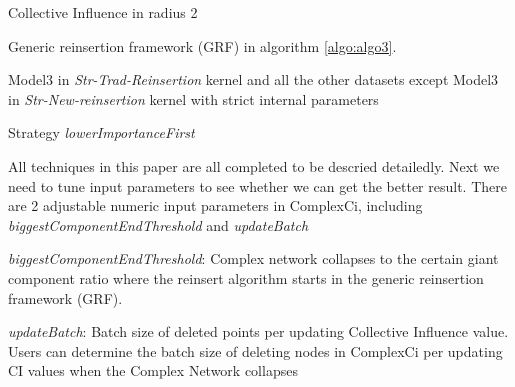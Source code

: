 \documentclass{article}
\begin{document}
	\begin{enumerate}
	
		\begin{item}	
			Collective Influence in radius 2
		\end{item}
	
		\begin{item}	
			Generic reinsertion framework (GRF) in algorithm \ref{algo:algo3}. 
		\end{item}	
		
		\begin{item}
			Model3 in \textit{Str-Trad-Reinsertion} kernel and all the other datasets except Model3 in \textit{Str-New-reinsertion} kernel with strict internal parameters
		\end{item}
	
		\begin{item}
			Strategy \textit{lowerImportanceFirst}
		\end{item}	
	
	\end{enumerate}	
	 
	 
	 
	 All techniques in this paper are all completed to be descried detailedly. Next we need to tune input parameters to see whether we can get the better result. There are 2 adjustable numeric input parameters in ComplexCi, including \textit{biggestComponentEndThreshold} and \textit{updateBatch}
	 
	 
	 
	\begin{enumerate}
	
		\begin{item}	
			\textit{biggestComponentEndThreshold}: Complex network collapses to the certain giant component ratio where the reinsert algorithm starts in the generic reinsertion framework (GRF). 
		\end{item}
		
		\begin{item}	
			\textit{updateBatch}: Batch size of deleted points per updating Collective Influence value. Users can determine the batch size of deleting nodes in ComplexCi per updating CI values when the Complex Network collapses
		\end{item}	

	\end{enumerate}	
	 
	 
	 
	 
	 
	 



	 
	
	
	
	
	
	
	
	
\end{document}
